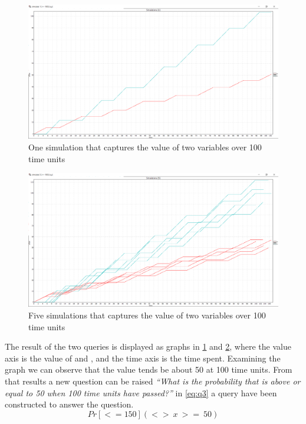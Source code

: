 \begin{figure}[!h]
	\includegraphics[width=\textwidth]{graphics/showcase01.png}
	\caption{One simulation that captures the value of two variables  over 100 time units}
	\label{fig:sim01}
\end{figure}

\begin{figure}[!h]
	\includegraphics[width=\textwidth]{graphics/showcase02.png}
	\caption{Five simulations that captures the value of two variables  over 100 time units}
	\label{fig:sim02}
\end{figure}

The result of the two queries is displayed as graphs in \cref{fig:sim01} and \cref{fig:sim02}, where the value axis is the value of  and , and the time axis is the time spent.
Examining the graph we can observe that the value  tends be about 50 at 100 time units.
From that results a new question can be raised \textit{``What is the probability that  is above or equal to 50 when 100 time units have passed?''} in \ref{eq:q3} a query have been constructed to answer the question.
\begin{equation}\label{eq:q3}
Pr[<=150](<>\ x\ >=\ 50)
\end{equation}

